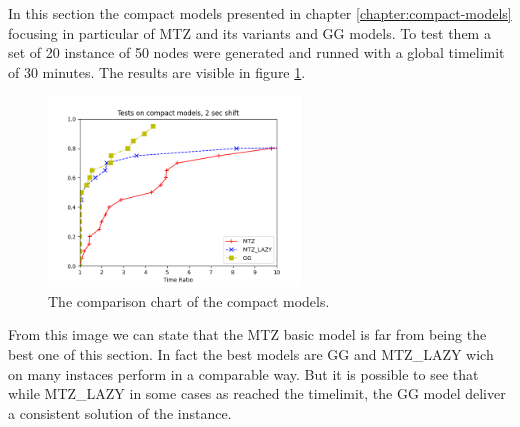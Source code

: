 In this section the compact models presented in chapter \ref{chapter:compact-models} focusing in particular of MTZ and its variants and GG models. To test them a set of 20 instance of 50 nodes were generated and runned with a global timelimit of 30 minutes. The results are visible in figure \ref{fig:result-compact}.

\begin{figure}[h]
	\centering
	\includegraphics[width=0.6\textwidth]{images/final_mtz_mtzlazy_gg.png}
	\caption{The comparison chart of the compact models.}
	\label{fig:result-compact}
\end{figure}

From this image we can state that the MTZ basic model is far from being the best one of this section. In fact the best models are GG and MTZ\_LAZY wich on many instaces perform in a comparable way. But it is possible to see that while MTZ\_LAZY in some cases as reached the timelimit, the GG model deliver a consistent solution of the instance.